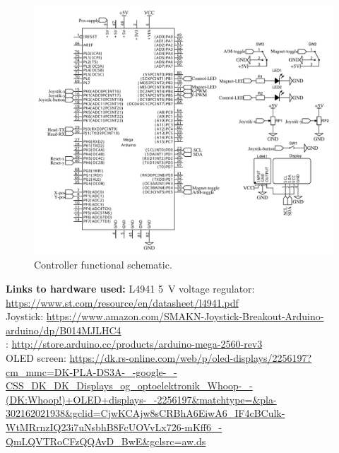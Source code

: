 \begin{figure}[H]
    \centering
    \includegraphics[width=1\textwidth]{pictures/Schematic_Kran_2022-02-16.pdf}
    \caption{Controller functional schematic.}
    \label{fig:controller_connections}
\end{figure}

\textbf{Links to hardware used:}\newline
L4941 \SI{5}{V} voltage regulator:\newline
\url{https://www.st.com/resource/en/datasheet/l4941.pdf}\\

Joystick:\newline
\url{https://www.amazon.com/SMAKN-Joystick-Breakout-Arduino-arduino/dp/B014MJLHC4}\\

\amega:\newline
\url{http://store.arduino.cc/products/arduino-mega-2560-rev3}\\

OLED screen:\newline
\url{https://dk.rs-online.com/web/p/oled-displays/2256197?cm_mmc=DK-PLA-DS3A-_-google-_-CSS_DK_DK_Displays_og_optoelektronik_Whoop-_-(DK:Whoop!)+OLED+displays-_-2256197&matchtype=&pla-302162021938&gclid=CjwKCAjw8sCRBhA6EiwA6_IF4cBCulk-WtMRrnzIQ23i7uNsbhB8FcUOVvLx726-mKff6_-QmLQVTRoCFzQQAvD_BwE&gclsrc=aw.ds}